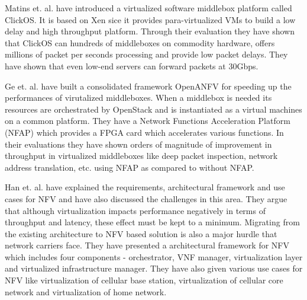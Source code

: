 Matins et. al. \cite{martins2014clickos} have introduced a virtualized software middlebox platform called ClickOS. It is based on Xen sice it provides para-virtualized VMs to build a low delay and high throughput platform. Through their evaluation they have shown that ClickOS can hundreds of middleboxes on commodity hardware, offers millions of packet per seconds processing and provide low packet delays. They have shown that even low-end servers can forward packets at 30Gbps. 

Ge et. al. \cite{ge2014openanfv} have built a consolidated framework OpenANFV for speeding up the performances of virutalized middleboxes. When a middlebox is needed its resources are orchestrated by OpenStack and is instantiated as a virtual machines on a common platform. They have a Network Functions Acceleration Platform (NFAP) which provides a FPGA card which accelerates various functions. In their evaluations they have shown orders of magnitude of improvement in throughput in virtualized middleboxes like deep  packet inspection, network address translation, etc. using NFAP as compared to without NFAP.

Han et. al. \cite{han2015network} have  explained the requirements, architectural framework and use cases for NFV and have also discussed the challenges in this area. They argue that although virtualization impacts performance negatively in terms of throughput and latency, these effect must be kept to a minimum. Migrating from the existing architecture to NFV based solution is also a major hurdle that network carriers face. They have presented a architectural framework for NFV which includes four components - orchestrator, VNF manager, virtualization layer and virtualized infrastructure manager. They have also given various use cases for NFV like virtualization of cellular base station, virtualization of cellular core network and virtualization of home network.